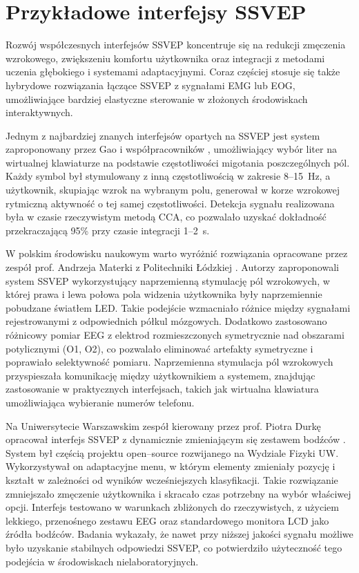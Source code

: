 \section{Przykładowe interfejsy SSVEP}

Rozwój współczesnych interfejsów SSVEP koncentruje się na redukcji zmęczenia wzrokowego, zwiększeniu komfortu użytkownika oraz integracji z metodami uczenia głębokiego i systemami adaptacyjnymi. Coraz częściej stosuje się także hybrydowe rozwiązania łączące SSVEP z sygnałami EMG lub EOG, umożliwiające bardziej elastyczne sterowanie w złożonych środowiskach interaktywnych.

Jednym z najbardziej znanych interfejsów opartych na SSVEP jest system zaproponowany przez Gao i współpracowników \cite{gao2014}, umożliwiający wybór liter na wirtualnej klawiaturze na podstawie częstotliwości migotania poszczególnych pól. Każdy symbol był stymulowany z inną częstotliwością w zakresie 8--15~Hz, a użytkownik, skupiając wzrok na wybranym polu, generował w korze wzrokowej rytmiczną aktywność o tej samej częstotliwości. Detekcja sygnału realizowana była w czasie rzeczywistym metodą CCA, co pozwalało uzyskać dokładność przekraczającą 95\% przy czasie integracji 1--2~s. 

W polskim środowisku naukowym warto wyróżnić rozwiązania opracowane przez zespół prof. Andrzeja Materki z Politechniki Łódzkiej \cite{materka2006alternate, materka2007virtual}. Autorzy zaproponowali system SSVEP wykorzystujący naprzemienną stymulację pól wzrokowych, w której prawa i lewa połowa pola widzenia użytkownika były naprzemiennie pobudzane światłem LED. Takie podejście wzmacniało różnice między sygnałami rejestrowanymi z odpowiednich półkul mózgowych. Dodatkowo zastosowano różnicowy pomiar EEG z elektrod rozmieszczonych symetrycznie nad obszarami potylicznymi (O1, O2), co pozwalało eliminować artefakty symetryczne i poprawiało selektywność pomiaru. Naprzemienna stymulacja pól wzrokowych przyspieszała komunikację między użytkownikiem a systemem, znajdując zastosowanie w praktycznych interfejsach, takich jak wirtualna klawiatura umożliwiająca wybieranie numerów telefonu. 

Na Uniwersytecie Warszawskim zespół kierowany przez prof. Piotra Durkę opracował interfejs SSVEP z dynamicznie zmieniającym się zestawem bodźców \cite{durka2009open}. System był częścią projektu open--source rozwijanego na Wydziale Fizyki UW. Wykorzystywał on adaptacyjne menu, w którym elementy zmieniały pozycję i kształt w zależności od wyników wcześniejszych klasyfikacji. Takie rozwiązanie zmniejszało zmęczenie użytkownika i skracało czas potrzebny na wybór właściwej opcji. Interfejs testowano w warunkach zbliżonych do rzeczywistych, z użyciem lekkiego, przenośnego zestawu EEG oraz standardowego monitora LCD jako źródła bodźców. Badania wykazały, że nawet przy niższej jakości sygnału możliwe było uzyskanie stabilnych odpowiedzi SSVEP, co potwierdziło użyteczność tego podejścia w środowiskach nielaboratoryjnych.

